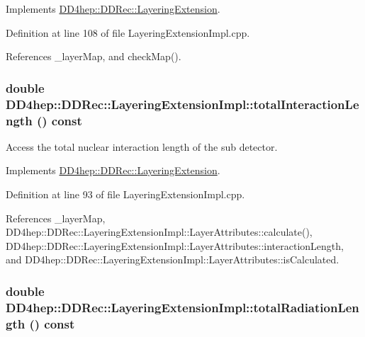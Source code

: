 Implements \hyperlink{class_d_d4hep_1_1_d_d_rec_1_1_layering_extension_a6510f43f195374e6adfb4312c27da450}{DD4hep::DDRec::LayeringExtension}.

Definition at line 108 of file LayeringExtensionImpl.cpp.

References \_\-layerMap, and checkMap().\hypertarget{class_d_d4hep_1_1_d_d_rec_1_1_layering_extension_impl_a1f474d15b2423bea9768d3a03625d507}{
\subsubsection[{totalInteractionLength}]{\setlength{\rightskip}{0pt plus 5cm}double DD4hep::DDRec::LayeringExtensionImpl::totalInteractionLength () const}}
\label{class_d_d4hep_1_1_d_d_rec_1_1_layering_extension_impl_a1f474d15b2423bea9768d3a03625d507}


Access the total nuclear interaction length of the sub detector. 

Implements \hyperlink{class_d_d4hep_1_1_d_d_rec_1_1_layering_extension_aa5440bf9dc11305a785765ca155437fa}{DD4hep::DDRec::LayeringExtension}.

Definition at line 93 of file LayeringExtensionImpl.cpp.

References \_\-layerMap, DD4hep::DDRec::LayeringExtensionImpl::LayerAttributes::calculate(), DD4hep::DDRec::LayeringExtensionImpl::LayerAttributes::interactionLength, and DD4hep::DDRec::LayeringExtensionImpl::LayerAttributes::isCalculated.\hypertarget{class_d_d4hep_1_1_d_d_rec_1_1_layering_extension_impl_a220aae6042be5005f3f51367cee0a314}{
\subsubsection[{totalRadiationLength}]{\setlength{\rightskip}{0pt plus 5cm}double DD4hep::DDRec::LayeringExtensionImpl::totalRadiationLength () const}}
\label{class_d_d4hep_1_1_d_d_rec_1_1_layering_extension_impl_a220aae6042be5005f3f51367cee0a314}


